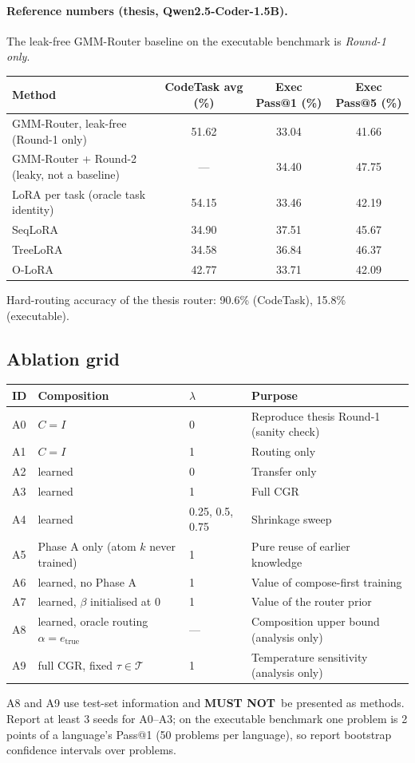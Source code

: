 \documentclass[11pt]{article}
\newcommand{\MUSTNOT}{\textbf{MUST NOT}}
\begin{document}
\paragraph{Reference numbers (thesis, Qwen2.5-Coder-1.5B).} The leak-free GMM-Router baseline on the executable
benchmark is \emph{Round-1 only}.
\begin{center}
\small
\begin{tabular}{@{}lccc@{}}
\toprule
Method & CodeTask avg (\%) & Exec Pass@1 (\%) & Exec Pass@5 (\%)\\
\midrule
GMM-Router, leak-free (Round-1 only) & 51.62 & 33.04 & 41.66\\
GMM-Router + Round-2 (leaky, not a baseline) & --- & 34.40 & 47.75\\
LoRA per task (oracle task identity) & 54.15 & 33.46 & 42.19\\
SeqLoRA & 34.90 & 37.51 & 45.67\\
TreeLoRA & 34.58 & 36.84 & 46.37\\
O-LoRA & 42.77 & 33.71 & 42.09\\
\bottomrule
\end{tabular}
\end{center}
Hard-routing accuracy of the thesis router: 90.6\% (CodeTask), 15.8\% (executable).

\subsection{Ablation grid}\label{sec:ablations}
\begin{center}
\small
\begin{tabular}{@{}llll@{}}
\toprule
ID & Composition & $\lambda$ & Purpose\\
\midrule
A0 & $C=I$ & 0 & Reproduce thesis Round-1 (sanity check)\\
A1 & $C=I$ & 1 & Routing only\\
A2 & learned & 0 & Transfer only\\
A3 & learned & 1 & Full CGR\\
A4 & learned & 0.25, 0.5, 0.75 & Shrinkage sweep\\
A5 & Phase A only (atom $k$ never trained) & 1 & Pure reuse of earlier knowledge\\
A6 & learned, no Phase A & 1 & Value of compose-first training\\
A7 & learned, $\beta$ initialised at 0 & 1 & Value of the router prior\\
A8 & learned, oracle routing $\alpha=e_{\text{true}}$ & --- & Composition upper bound (analysis only)\\
A9 & full CGR, fixed $\tau\in\mathcal T$ & 1 & Temperature sensitivity (analysis only)\\
\bottomrule
\end{tabular}
\end{center}
A8 and A9 use test-set information and \MUSTNOT\ be presented as methods. Report at least 3 seeds for A0--A3;
on the executable benchmark one problem is 2 points of a language's Pass@1 (50 problems per language), so report
bootstrap confidence intervals over problems.
\end{document}
